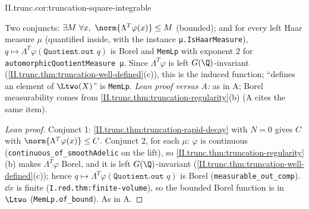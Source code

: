\begin{tfformal}{II.trunc.cor:truncation-square-integrable}
\begin{tffidelity}
Two conjuncts: $\exists M\ \forall x,\ \norm{\Lambda^T\varphi(x)}\le M$ (bounded); and for every left Haar measure $\mu$ (quantified inside, with the instance \texttt{μ.IsHaarMeasure}), $q\mapsto\Lambda^T\varphi(\texttt{Quotient.out }q)$ is Borel and \texttt{MemLp} with exponent $2$ for \texttt{automorphicQuotientMeasure μ}. Since $\Lambda^T\varphi$ is left $G(\Q)$-invariant (\cref{II.trunc.thm:truncation-well-defined}(c)), this is the induced function; ``defines an element of $\Ltwo(X)$'' is \texttt{MemLp}. \emph{Lean proof versus A:} as in A; Borel measurability comes from \cref{II.trunc.thm:truncation-regularity}(b) (A cites the same item).
\end{tffidelity}
\end{tfformal}
\begin{proof}[Lean proof]
Conjunct 1: \cref{II.trunc.thm:truncation-rapid-decay} with $N=0$ gives $C$ with $\norm{\Lambda^T\varphi(x)}\le C$. Conjunct 2, for each $\mu$: $\varphi$ is continuous (\texttt{continuous\_of\_smoothAdelic} on the lift), so \cref{II.trunc.thm:truncation-regularity}(b) makes $\Lambda^T\varphi$ Borel, and it is left $G(\Q)$-invariant (\cref{II.trunc.thm:truncation-well-defined}(c)); hence $q\mapsto\Lambda^T\varphi(\texttt{Quotient.out }q)$ is Borel (\texttt{measurable\_out\_comp}). $\dd\dot x$ is finite (\texttt{I.red.thm:finite-volume}), so the bounded Borel function is in $\Ltwo$ (\texttt{MemLp.of\_bound}). As in A.
\end{proof}

